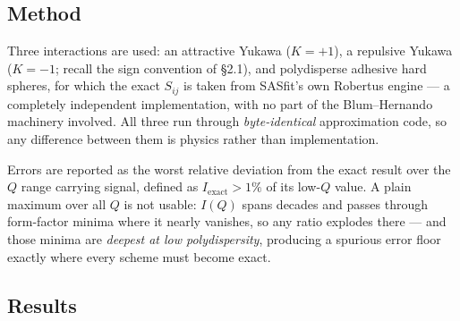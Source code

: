 \documentclass[11pt,a4paper]{article}
\begin{document}
\subsection{Method}

Three interactions are used: an attractive Yukawa ($K=+1$), a repulsive Yukawa
($K=-1$; recall the sign convention of \S2.1), and polydisperse adhesive hard
spheres, for which the exact
$S_{ij}$ is taken from SASfit's own Robertus engine
\cite{Robertus1989} --- a completely independent implementation, with no part
of the Blum--Hernando machinery involved. All three run through
\emph{byte-identical} approximation code, so any difference between them is
physics rather than implementation.

Errors are reported as the worst relative deviation from the exact result over
the $Q$ range carrying signal, defined as $I_{\text{exact}}>1\%$ of its low-$Q$
value. A plain maximum over all $Q$ is not usable: $I(Q)$ spans decades and
passes through form-factor minima where it nearly vanishes, so any ratio
explodes there --- and those minima are \emph{deepest at low polydispersity},
producing a spurious error floor exactly where every scheme must become exact.

\subsection{Results}
\end{document}
